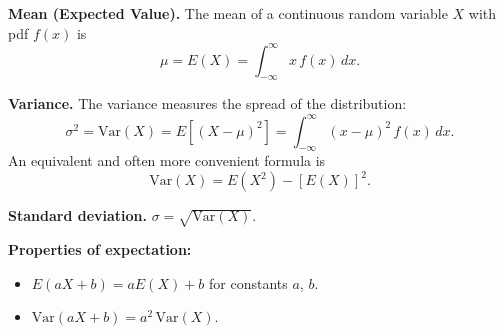 
\textbf{Mean (Expected Value).} The mean of a continuous random variable $X$ with pdf $f(x)$ is
\[
\mu = E(X) = \int_{-\infty}^{\infty} x\,f(x)\,dx.
\]

\textbf{Variance.} The variance measures the spread of the distribution:
\[
\sigma^2 = \mathrm{Var}(X) = E\!\left[(X - \mu)^2\right] = \int_{-\infty}^{\infty} (x-\mu)^2\,f(x)\,dx.
\]
An equivalent and often more convenient formula is
\[
\mathrm{Var}(X) = E(X^2) - [E(X)]^2.
\]

\textbf{Standard deviation.} $\sigma = \sqrt{\mathrm{Var}(X)}.$

\textbf{Properties of expectation:}
\begin{itemize}[leftmargin=*]
  \item $E(aX + b) = aE(X) + b$ for constants $a$, $b$.
  \item $\mathrm{Var}(aX + b) = a^2\,\mathrm{Var}(X)$.
\end{itemize}

